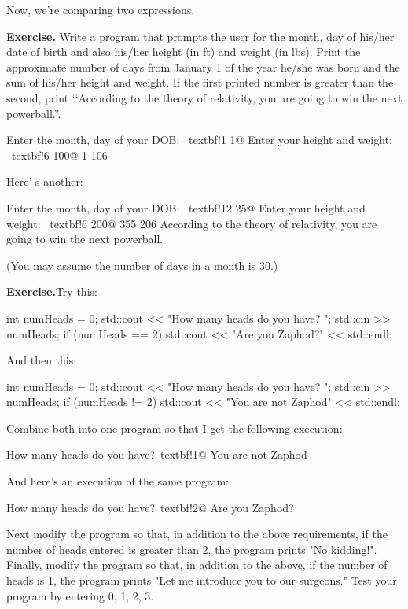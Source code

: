 Now, we're comparing two expressions.

\textbf{Exercise.} Write a program that prompts the user for the month,
day of his/her date of birth and also his/her height (in ft) and weight
(in lbs). Print the approximate number of days from January 1 of the
year he/she was born and the sum of his/her height and weight. If the
first printed number is greater than the second, print \lq\lq According to
the theory of relativity, you are going to win the next powerball.''.
\begin{console}[commandchars=\~\!\@]
Enter the month, day of your DOB: ~textbf!1 1@
Enter your height and weight: ~textbf!6 100@
1 106
\end{console}
Here' s another:
\begin{console}[commandchars=\~\!\@]
Enter the month, day of your DOB: ~textbf!12 25@
Enter your height and weight: ~textbf!6 200@
355 206
According to the theory of relativity,
you are going to win the next powerball.
\end{console}
(You may assume the number of days in a month is 30.)

\textbf{Exercise.}Try this:\\
\begin{console}[commandchars=\~\!\@]
int numHeads = 0;
std::cout << "How many heads do you have? ";
std::cin >> numHeads;
if (numHeads == 2)
   std::cout << "Are you Zaphod?" << std::endl;
\end{console}

And then this:

\begin{console}
int numHeads = 0;
std::cout << "How many heads do you have? ";
std::cin >> numHeads;
if (numHeads != 2)
   std::cout << "You are not Zaphod" << std::endl;
\end{console}

Combine both into one program so that I get the following execution:\\
\begin{console}[commandchars=\~\!\@]
How many heads do you have?~textbf!1@
You are not Zaphod
\end{console}
And here's an execution of the same program:\\
\begin{console}[commandchars=\~\!\@]
How many heads do you have?~textbf!2@
Are you Zaphod?
\end{console}
Next modify the program so that, in addition to the above requirements,
if the number of heads entered is greater than 2, the program prints "No
kidding!". Finally, modify the program so that, in addition to the
above, if the number of heads is 1, the program prints "Let me introduce
you to our surgeons." Test your program by entering 0, 1, 2, 3.

